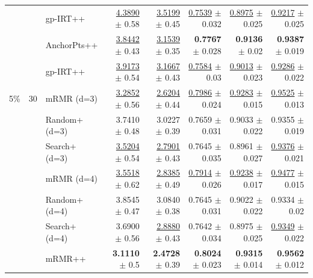 \begin{longtable}{llp{}rrrrr}
 &  & gp-IRT++ & \underline{4.3890} {\scriptsize $\pm$ 0.58} & \underline{3.5199} {\scriptsize $\pm$ 0.45} & \underline{0.7539} {\scriptsize $\pm$ 0.032} & \underline{0.8975} {\scriptsize $\pm$ 0.025} & \underline{0.9217} {\scriptsize $\pm$ 0.025} \\
 &  & AnchorPts++ & \underline{3.8442} {\scriptsize $\pm$ 0.43} & \underline{3.1539} {\scriptsize $\pm$ 0.35} & \textbf{0.7767} {\scriptsize $\pm$ 0.028} & \textbf{0.9136} {\scriptsize $\pm$ 0.02} & \textbf{0.9387} {\scriptsize $\pm$ 0.019} \\
 &  & gp-IRT++ & \underline{3.9173} {\scriptsize $\pm$ 0.54} & \underline{3.1667} {\scriptsize $\pm$ 0.43} & \underline{0.7584} {\scriptsize $\pm$ 0.03} & \underline{0.9013} {\scriptsize $\pm$ 0.023} & \underline{0.9286} {\scriptsize $\pm$ 0.022} \\
\midrule
5\% & 30 & mRMR (d=3) & \underline{3.2852} {\scriptsize $\pm$ 0.56} & \underline{2.6204} {\scriptsize $\pm$ 0.44} & \underline{0.7986} {\scriptsize $\pm$ 0.024} & \underline{0.9283} {\scriptsize $\pm$ 0.015} & \underline{0.9525} {\scriptsize $\pm$ 0.013} \\
 &  & Random+ (d=3) & 3.7410 {\scriptsize $\pm$ 0.48} & 3.0227 {\scriptsize $\pm$ 0.39} & 0.7659 {\scriptsize $\pm$ 0.031} & 0.9033 {\scriptsize $\pm$ 0.022} & 0.9355 {\scriptsize $\pm$ 0.019} \\
 &  & Search+ (d=3) & \underline{3.5204} {\scriptsize $\pm$ 0.54} & \underline{2.7901} {\scriptsize $\pm$ 0.43} & 0.7645 {\scriptsize $\pm$ 0.035} & 0.8961 {\scriptsize $\pm$ 0.027} & \underline{0.9376} {\scriptsize $\pm$ 0.021} \\
 &  & mRMR (d=4) & \underline{3.5518} {\scriptsize $\pm$ 0.62} & \underline{2.8385} {\scriptsize $\pm$ 0.49} & \underline{0.7914} {\scriptsize $\pm$ 0.026} & \underline{0.9238} {\scriptsize $\pm$ 0.017} & \underline{0.9477} {\scriptsize $\pm$ 0.015} \\
 &  & Random+ (d=4) & 3.8545 {\scriptsize $\pm$ 0.47} & 3.0840 {\scriptsize $\pm$ 0.38} & 0.7645 {\scriptsize $\pm$ 0.031} & 0.9022 {\scriptsize $\pm$ 0.022} & 0.9334 {\scriptsize $\pm$ 0.02} \\
 &  & Search+ (d=4) & 3.6900 {\scriptsize $\pm$ 0.56} & \underline{2.8880} {\scriptsize $\pm$ 0.43} & 0.7642 {\scriptsize $\pm$ 0.034} & 0.8975 {\scriptsize $\pm$ 0.025} & \underline{0.9349} {\scriptsize $\pm$ 0.022} \\
 &  & mRMR++ & \textbf{3.1110} {\scriptsize $\pm$ 0.5} & \textbf{2.4728} {\scriptsize $\pm$ 0.39} & \textbf{0.8024} {\scriptsize $\pm$ 0.023} & \textbf{0.9315} {\scriptsize $\pm$ 0.014} & \textbf{0.9562} {\scriptsize $\pm$ 0.012} \\

\end{longtable}
